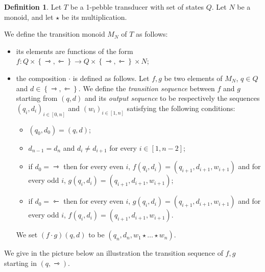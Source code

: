 \documentclass{article}
\newcommand{\set}[1]{\left\{#1 \right\}}
\newcommand{\mleft}{\leftarrowtriangle}
\newcommand{\mright}{\rightarrowtriangle}
\theoremstyle{definition}
\newtheorem{definition}[theorem]{Definition}
\theoremstyle{remark}
\begin{document}
\begin{definition}%
Let $T$ be a 1-pebble transducer with set of states $Q$. Let $N$ be a monoid, and let $\star$ be its multiplication.

We define the transition monoid $M_N$ of $T$ as follows:
\begin{itemize}
\item its elements are functions of the form $f:Q\times\set{\mright,\mleft}\to Q\times\set{\mright,\mleft}\times N$;
\item the composition $\cdot$ is defined as follows. Let $f, g$ be two elements of $M_N$, $q\in Q$ and $d\in\set{\mright, \mleft}$. We define the \emph{transition sequence} between 
$f$ and $g$ starting from $(q,d)$ and its \emph{output sequence} to be respectively the sequences $(q_i,d_i)_{i\in[0,n]}$ and  $(w_i)_{i\in[1,n]}$ satisfying the following conditions: 
\begin{itemize}
\item $(q_0,d_0)=(q,d)$;
\item $d_{n-1}=d_{n}$ and $d_i\neq d_{i+1}$ for every $i\in[1,n-2]$;
\item if $d_0=\mright$ then for every even $i$, $f(q_i,d_i)=(q_{i+1},d_{i+1}, w_{i+1})$ and for every odd $i$, $g(q_i,d_i)=(q_{i+1},d_{i+1}, w_{i+1})$;
\item if $d_0=\mleft$ then for every even $i$, $g(q_i,d_i)=(q_{i+1},d_{i+1}, w_{i+1})$ and for every odd $i$, $f(q_i,d_i)=(q_{i+1},d_{i+1}, w_{i+1})$. 
\end{itemize}
We set $(f\cdot g) (q,d)$ to be $(q_n, d_n, w_1\star\dots\star w_n)$.
\end{itemize}
We give in the picture below an illustration the transition sequence of $f,g$ starting in $(q,\mright)$.
\begin{center}
\end{center}
\end{definition}
\end{document}
